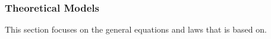 \documentclass[12pt]{article}
\begin{document}
\newpage
\subsubsection{Theoretical Models}\label{sec_theoretical}



This section focuses on the general equations and laws that \progname{} is based
on.  

~\newline
\end{document}
